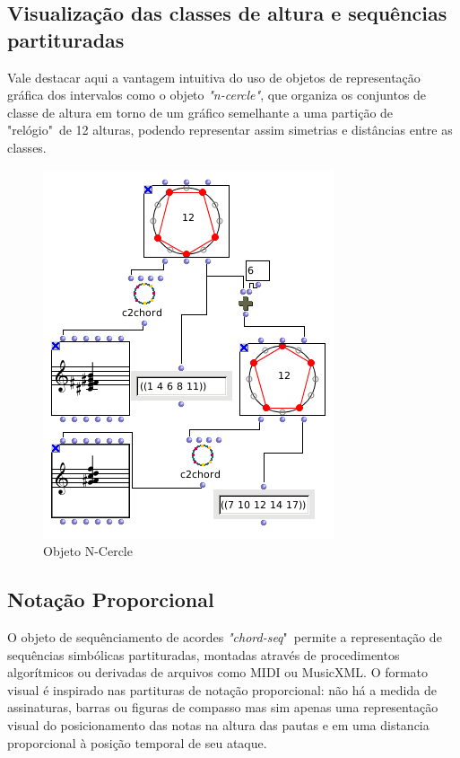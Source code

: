 \documentclass[
	12pt,				%
	openright,			%
	twoside,			%
	a4paper,			%
	english,			%
	french,				%
	spanish,			%
	brazil				%
	]{abntex2}
\begin{document}
\subsection{Visualização das classes de altura e sequências partituradas}

Vale destacar aqui a vantagem intuitiva do uso de objetos de representação gráfica dos intervalos como o objeto \textit{"n-cercle"}, que organiza os conjuntos de classe de altura em torno de um gráfico semelhante a uma partição de "relógio"\ de 12 alturas, podendo representar assim simetrias e distâncias entre as classes.

\begin{figure}[!h]
	\caption{\label{fig_grafico}Objeto N-Cercle }
	\begin{center}
	    \includegraphics[scale=0.5]{estudosM21/ncercle.png}
	\end{center}
\end{figure}

\subsection{Notação Proporcional}

O objeto de sequênciamento de acordes \textit{"chord-seq}"\ permite a representação de sequências simbólicas partituradas, montadas através de procedimentos algorítmicos ou derivadas de arquivos como MIDI ou MusicXML. O formato visual é inspirado nas partituras de notação proporcional: não há a medida de assinaturas, barras ou figuras de compasso mas sim apenas uma representação visual do posicionamento das notas na altura das pautas e em uma distancia proporcional à posição temporal de seu ataque.
\end{document}
